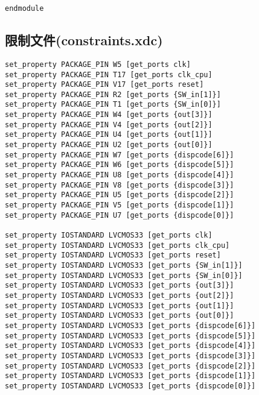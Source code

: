 \begin{multicols}{2}
\begin{lstlisting}
endmodule
\end{lstlisting}

\subsection{限制文件(constraints.xdc)}
\begin{lstlisting}
set_property PACKAGE_PIN W5 [get_ports clk]
set_property PACKAGE_PIN T17 [get_ports clk_cpu]
set_property PACKAGE_PIN V17 [get_ports reset]
set_property PACKAGE_PIN R2 [get_ports {SW_in[1]}]
set_property PACKAGE_PIN T1 [get_ports {SW_in[0]}]
set_property PACKAGE_PIN W4 [get_ports {out[3]}]
set_property PACKAGE_PIN V4 [get_ports {out[2]}]
set_property PACKAGE_PIN U4 [get_ports {out[1]}]
set_property PACKAGE_PIN U2 [get_ports {out[0]}]
set_property PACKAGE_PIN W7 [get_ports {dispcode[6]}]
set_property PACKAGE_PIN W6 [get_ports {dispcode[5]}]
set_property PACKAGE_PIN U8 [get_ports {dispcode[4]}]
set_property PACKAGE_PIN V8 [get_ports {dispcode[3]}]
set_property PACKAGE_PIN U5 [get_ports {dispcode[2]}]
set_property PACKAGE_PIN V5 [get_ports {dispcode[1]}]
set_property PACKAGE_PIN U7 [get_ports {dispcode[0]}]

set_property IOSTANDARD LVCMOS33 [get_ports clk]
set_property IOSTANDARD LVCMOS33 [get_ports clk_cpu]
set_property IOSTANDARD LVCMOS33 [get_ports reset]
set_property IOSTANDARD LVCMOS33 [get_ports {SW_in[1]}]
set_property IOSTANDARD LVCMOS33 [get_ports {SW_in[0]}]
set_property IOSTANDARD LVCMOS33 [get_ports {out[3]}]
set_property IOSTANDARD LVCMOS33 [get_ports {out[2]}]
set_property IOSTANDARD LVCMOS33 [get_ports {out[1]}]
set_property IOSTANDARD LVCMOS33 [get_ports {out[0]}]
set_property IOSTANDARD LVCMOS33 [get_ports {dispcode[6]}]
set_property IOSTANDARD LVCMOS33 [get_ports {dispcode[5]}]
set_property IOSTANDARD LVCMOS33 [get_ports {dispcode[4]}]
set_property IOSTANDARD LVCMOS33 [get_ports {dispcode[3]}]
set_property IOSTANDARD LVCMOS33 [get_ports {dispcode[2]}]
set_property IOSTANDARD LVCMOS33 [get_ports {dispcode[1]}]
set_property IOSTANDARD LVCMOS33 [get_ports {dispcode[0]}]
\end{lstlisting}
\end{multicols}